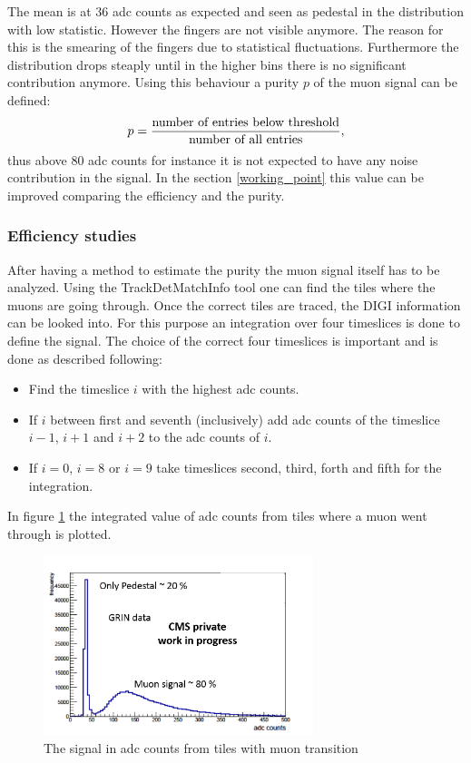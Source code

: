			The mean is at 36 adc counts as expected and seen as pedestal in the distribution with low statistic.
			However the fingers are not visible anymore.
			The reason for this is the smearing of the fingers due to statistical fluctuations.
			Furthermore the distribution drops steaply until in the higher bins there is no significant contribution anymore.
			Using this behaviour a purity $p$ of the muon signal can be defined:
			\begin{equation}
				p = \frac{\textnormal{number of entries below threshold}}{\textnormal{number of all entries}},
			\end{equation}
			thus above 80 adc counts for instance it is not expected to have any noise contribution in the signal.
			In the section \ref{working_point} this value can be improved comparing the efficiency and the purity.
		\subsubsection{Efficiency studies}
			After having a method to estimate the purity the muon signal itself has to be analyzed.
			Using the TrackDetMatchInfo tool one can find the tiles where the muons are going through.
			Once the correct tiles are traced, the DIGI information can be looked into.
			For this purpose an integration over four timeslices is done to define the signal.
			The choice of the correct four timeslices is important and is done as described following:
			\begin{itemize}
			  \item Find the timeslice $i$ with the highest adc counts.
			  \item If $i$ between first and seventh (inclusively) add adc counts of the timeslice $i-1$, $i+1$ and $i+2$ to the adc counts of $i$.
			  \item If $i=0$, $i=8$ or $i=9$ take timeslices second, third, forth and fifth for the integration.
			\end{itemize}
			In figure \ref{fig:efficiency1x1} the integrated value of adc counts from tiles where a muon went through is plotted.
			\begin{figure}[htbp]
				\centering
				\includegraphics[width=0.70\textwidth]{Figures/erdogan/efficiency1x1.png}
				\caption{The signal in adc counts from tiles with muon transition}
				\label{fig:efficiency1x1}
			\end{figure}
